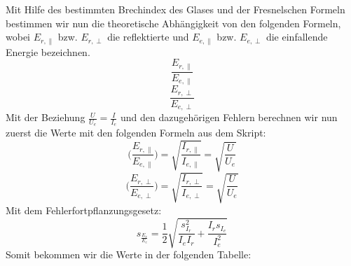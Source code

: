 Mit Hilfe des bestimmten Brechindex des Glases und der Fresnelschen Formeln bestimmen wir nun die theoretische Abhängigkeit von den folgenden Formeln, wobei $E_{r,\parallel}$ bzw. $E_{r,\perp}$ die reflektierte und $E_{e,\parallel}$ bzw. $E_{e,\perp}$ die einfallende Energie bezeichnen. 
\begin{equation}
\frac{E_{r,\parallel}}{E_{e,\parallel}}  
\end{equation}
\begin{equation}
\frac{E_{r,\perp}}{E_{e,\perp}}
\end{equation}
Mit der Beziehung $\frac{U}{U_e}=\frac{I}{I_e}$ und den dazugehörigen Fehlern berechnen wir nun zuerst die Werte mit den folgenden Formeln aus dem Skript:
\begin{equation}
\biggl( \frac{E_{r,\parallel}}{E_{e,\parallel}} \biggr)=\sqrt{\frac{I_{r,\parallel}}{I_{e,\parallel}}} = \sqrt{\frac{U}{U_e}}
\end{equation}
\begin{equation}
\biggl( \frac{E_{r,\perp}}{E_{e,\perp}} \biggr)=\sqrt{\frac{I_{r,\perp}}{I_{e,\perp}}}=\sqrt{\frac{U}{U_e}}
\end{equation}
Mit dem Fehlerfortpflanzungsgesetz:
\begin{equation}
s_{\frac{E_r}{E_e}}=\frac{1}{2}\sqrt{\frac{s^2_{I_r}}{I_eI_r}+\frac{I_rs_{I_e}}{I_e^2}}
\end{equation}
Somit bekommen wir die Werte in der folgenden Tabelle:









